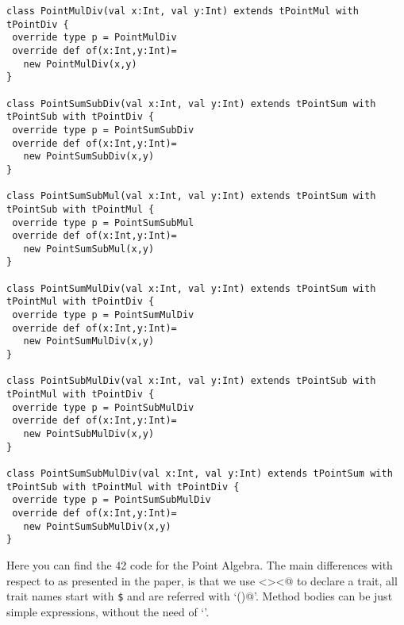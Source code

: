 \begin{lstlisting}[basicstyle=\tiny]
class PointMulDiv(val x:Int, val y:Int) extends tPointMul with tPointDiv {
 override type p = PointMulDiv
 override def of(x:Int,y:Int)=
   new PointMulDiv(x,y)
}

class PointSumSubDiv(val x:Int, val y:Int) extends tPointSum with tPointSub with tPointDiv {
 override type p = PointSumSubDiv
 override def of(x:Int,y:Int)=
   new PointSumSubDiv(x,y)
}

class PointSumSubMul(val x:Int, val y:Int) extends tPointSum with tPointSub with tPointMul {
 override type p = PointSumSubMul
 override def of(x:Int,y:Int)=
   new PointSumSubMul(x,y)
}

class PointSumMulDiv(val x:Int, val y:Int) extends tPointSum with tPointMul with tPointDiv {
 override type p = PointSumMulDiv
 override def of(x:Int,y:Int)=
   new PointSumMulDiv(x,y)
}

class PointSubMulDiv(val x:Int, val y:Int) extends tPointSub with tPointMul with tPointDiv {
 override type p = PointSubMulDiv
 override def of(x:Int,y:Int)=
   new PointSubMulDiv(x,y)
}

class PointSumSubMulDiv(val x:Int, val y:Int) extends tPointSum with tPointSub with tPointMul with tPointDiv {
 override type p = PointSumSubMulDiv
 override def of(x:Int,y:Int)=
   new PointSumSubMulDiv(x,y)
}
\end{lstlisting}

Here you can find the 42 code for the Point Algebra.
The main differences with respect to \name as presented in
the paper, is that we use \Q@Resource<><@
to declare a trait,
all trait names start with \texttt{\$}
and are referred with `\Q@()@'.
Method bodies can be just simple expressions, without the need
of `\Q@return@'.

